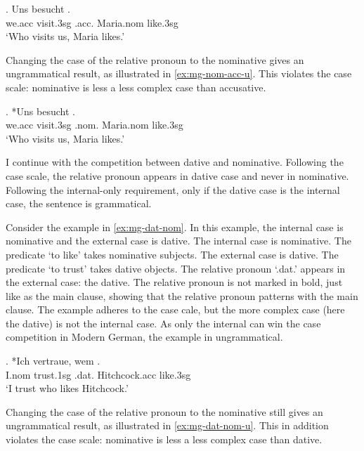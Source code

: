 \exg. Uns besucht   .\\
 we.\ac{acc} visit.3\ac{sg}\scsub{[nom]} .\ac{acc}. Maria.\ac{nom} like.3\ac{sg}\scsub{[acc]}\\
 `Who visits us, Maria likes.' \label{ex:mg-nom-acc}

Changing the case of the relative pronoun to the nominative gives an ungrammatical result, as illustrated in \ref{ex:mg-nom-acc-u}. This violates the case scale: nominative is less a less complex case than accusative.

\exg. *Uns besucht   .\\
 we.\ac{acc} visit.3\ac{sg}\scsub{[nom]} .\ac{nom}. Maria.\ac{nom} like.3\ac{sg}\scsub{[acc]}\\
 `Who visits us, Maria likes.' \label{ex:mg-nom-acc-u}

I continue with the competition between dative and nominative. Following the case scale, the relative pronoun appears in dative case and never in nominative. Following the internal-only requirement, only if the dative case is the internal case, the sentence is grammatical.

Consider the example in \ref{ex:mg-dat-nom}. In this example, the internal case is nominative and the external case is dative.
The internal case is nominative. The predicate  `to like' takes nominative subjects.
The external case is dative. The predicate  `to trust' takes dative objects.
The relative pronoun  `.\ac{dat}.' appears in the external case: the dative. The relative pronoun is not marked in bold, just like as the main clause, showing that the relative pronoun patterns with the main clause.
The example adheres to the case cale, but the more complex case (here the dative) is not the internal case. As only the internal can win the case competition in Modern German, the example in ungrammatical.

\exg. *Ich vertraue, wem  .\\
I.\ac{nom} trust.1\ac{sg}\scsub{[dat]} .\ac{dat}. Hitchcock.\ac{acc} like.3\ac{sg}\scsub{[nom]}\\
`I trust who likes Hitchcock.' \label{ex:mg-dat-nom}

Changing the case of the relative pronoun to the nominative still gives an ungrammatical result, as illustrated in \ref{ex:mg-dat-nom-u}. This in addition violates the case scale: nominative is less a less complex case than dative.

